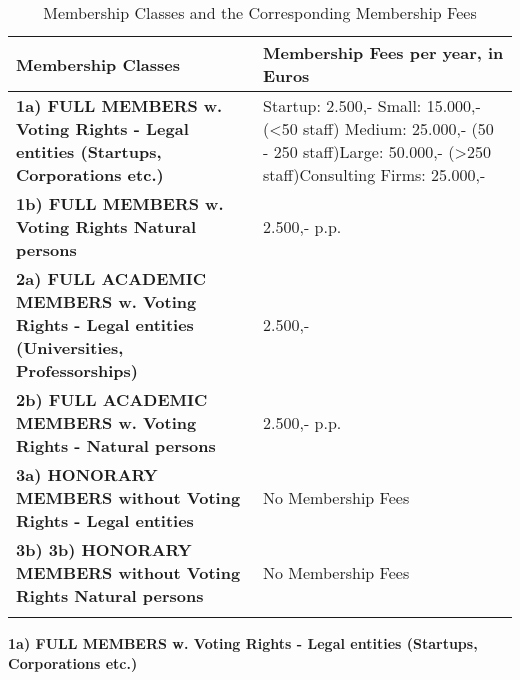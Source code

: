 \documentclass{article}
\begin{document}
\begin{longtable}{| p{} | p{} |}

	\hline
 	   \textbf{Membership Classes} & \textbf{Membership Fees per year, in Euros} \\ \hline\hline
 	   \textbf{1a) FULL MEMBERS w. Voting Rights - Legal entities (Startups, Corporations etc.)} &
	Startup: 2.500,- \newline Small: 15.000,- (\textless 50 staff) \newline Medium: 25.000,- (50 - 250 			staff)\newline Large: 50.000,- (\textgreater 250 staff)\newline Consulting Firms: 25.000,- \\
	\hline
		\textbf{1b) FULL MEMBERS w. Voting Rights Natural persons} & 2.500,- p.p. \\                                                                                                             	\hline
		\textbf{2a) FULL ACADEMIC MEMBERS w. Voting Rights - Legal entities (Universities, Professorships)} & 2.500,- \\                                                                                                             	\hline
		\textbf{2b) FULL ACADEMIC MEMBERS w. Voting Rights - Natural persons} & 2.500,-  p.p.\\                                                                                                             	\hline
		\textbf{3a) HONORARY MEMBERS without Voting Rights - Legal entities} & No Membership Fees \\                                                                                                             	\hline
		\textbf{3b) 3b) HONORARY MEMBERS without Voting Rights Natural persons} & No Membership Fees \\                                                                                                             	\hline
	
	\caption{Membership Classes and the Corresponding Membership Fees}
	\label{table:Mem_Classes}

\end{longtable}

\textbf{1a) FULL MEMBERS w. Voting Rights - Legal entities (Startups, Corporations etc.)} \\
\end{document}
